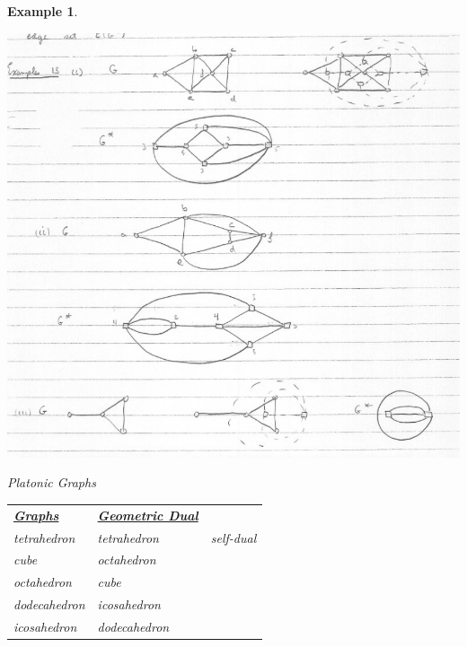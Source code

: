 \documentclass[12pt]{article}
\newtheorem{example}{Example}
\begin{document}
\begin{example}
  \begin{center}
    \includegraphics[scale=0.5]{dualgraph}
  \end{center}

  Platonic Graphs

  \begin{table}[H]
\begin{center}
\begin{tabular}{lll}
\uline{\textbf{Graphs}} & \uline{\textbf{Geometric Dual}} &              \\
tetrahedron             & tetrahedron                     & self-dual  \\
cube                    & octahedron                      &              \\
octahedron              & cube                            &              \\
dodecahedron            & icosahedron                     &              \\
icosahedron             & dodecahedron                    &
\end{tabular}
\end{center}
\end{table}
  
\end{example}
\end{document}
